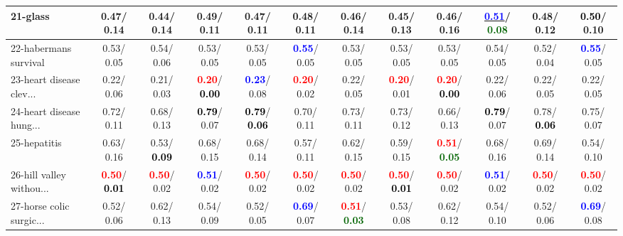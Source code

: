 \begin{table}[h]
\begin{center}
{\begin{tabular}{lc|c|c|c|c|c|c|c|c|c|c}
21-glass &   0.47/  0.14 &   0.44/  0.14 &   0.49/  0.11 &   0.47/  0.11 &   0.48/  0.11 &   0.46/  0.14 &   0.45/  0.13 &   0.46/  0.16 & \underline{\textcolor{blue}{\textbf{  0.51}}}/\textcolor{darkgreen}{\textbf{  0.08}} &   0.48/  0.12 & \textcolor{black}{\textbf{  0.50}}/  0.10 \\ \hline
22-habermans survival &   0.53/  0.05 &   0.54/  0.06 &   0.53/  0.05 &   0.53/  0.05 & \textcolor{blue}{\textbf{  0.55}}/  0.05 &   0.53/  0.05 &   0.53/  0.05 &   0.53/  0.05 &   0.54/  0.05 &   0.52/  0.04 & \textcolor{blue}{\textbf{  0.55}}/  0.05 \\
23-heart disease clev... &   0.22/  0.06 &   0.21/  0.03 & \textcolor{red}{\textbf{  0.20}}/\textcolor{black}{\textbf{  0.00}} & \textcolor{blue}{\textbf{  0.23}}/  0.08 & \textcolor{red}{\textbf{  0.20}}/  0.02 &   0.22/  0.05 & \textcolor{red}{\textbf{  0.20}}/  0.01 & \textcolor{red}{\textbf{  0.20}}/\textcolor{black}{\textbf{  0.00}} &   0.22/  0.06 &   0.22/  0.05 &   0.22/  0.05 \\
24-heart disease hung... &   0.72/  0.11 &   0.68/  0.13 & \textcolor{black}{\textbf{  0.79}}/  0.07 & \textcolor{black}{\textbf{  0.79}}/\textcolor{black}{\textbf{  0.06}} &   0.70/  0.11 &   0.73/  0.11 &   0.73/  0.12 &   0.66/  0.13 & \textcolor{black}{\textbf{  0.79}}/  0.07 &   0.78/\textcolor{black}{\textbf{  0.06}} &   0.75/  0.07 \\
25-hepatitis &   0.63/  0.16 &   0.53/\textcolor{black}{\textbf{  0.09}} &   0.68/  0.15 &   0.68/  0.14 &   0.57/  0.11 &   0.62/  0.15 &   0.59/  0.15 & \textcolor{red}{\textbf{  0.51}}/\textcolor{darkgreen}{\textbf{  0.05}} &   0.68/  0.16 &   0.69/  0.14 &   0.54/  0.10 \\
26-hill valley withou... & \textcolor{red}{\textbf{  0.50}}/\textcolor{black}{\textbf{  0.01}} & \textcolor{red}{\textbf{  0.50}}/  0.02 & \textcolor{blue}{\textbf{  0.51}}/  0.02 & \textcolor{red}{\textbf{  0.50}}/  0.02 & \textcolor{red}{\textbf{  0.50}}/  0.02 & \textcolor{red}{\textbf{  0.50}}/  0.02 & \textcolor{red}{\textbf{  0.50}}/\textcolor{black}{\textbf{  0.01}} & \textcolor{red}{\textbf{  0.50}}/  0.02 & \textcolor{blue}{\textbf{  0.51}}/  0.02 & \textcolor{red}{\textbf{  0.50}}/  0.02 & \textcolor{red}{\textbf{  0.50}}/  0.02 \\
27-horse colic surgic... &   0.52/  0.06 &   0.62/  0.13 &   0.54/  0.09 &   0.52/  0.05 & \textcolor{blue}{\textbf{  0.69}}/  0.07 & \textcolor{red}{\textbf{  0.51}}/\textcolor{darkgreen}{\textbf{  0.03}} &   0.53/  0.08 &   0.62/  0.12 &   0.54/  0.10 &   0.52/  0.06 & \textcolor{blue}{\textbf{  0.69}}/  0.08 \\

\end{tabular}}
\end{center}
\end{table}
